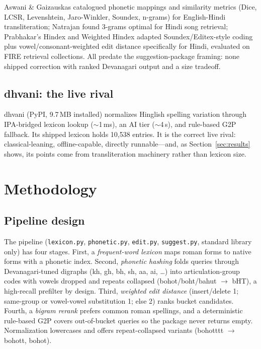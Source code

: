 \documentclass[11pt,a4paper]{article}
\begin{document}
Aswani \& Gaizauskas catalogued phonetic mappings and similarity metrics (Dice, LCSR, Levenshtein, Jaro-Winkler, Soundex, n-grams) for English-Hindi transliteration; Natrajan found 3-grams optimal for Hindi song retrieval; Prabhakar's Hindex and Weighted Hindex adapted Soundex/Editex-style coding plus vowel/consonant-weighted edit distance specifically for Hindi, evaluated on FIRE retrieval collections. All predate the suggestion-package framing: none shipped correction with ranked Devanagari output and a size tradeoff.

\subsection{dhvani: the live rival}

dhvani (PyPI, 9.7\,MB installed) normalizes Hinglish spelling variation through IPA-bridged lexicon lookup ($\sim$1\,ms), an AI tier ($\sim$4\,s), and rule-based G2P fallback. Its shipped lexicon holds 10,538 entries. It is the correct live rival: classical-leaning, offline-capable, directly runnable---and, as Section~\ref{sec:results} shows, its points come from transliteration machinery rather than lexicon size.

\section{Methodology}

\subsection{Pipeline design}

The pipeline (\verb!lexicon.py!, \verb!phonetic.py!, \verb!edit.py!, \verb!suggest.py!, standard library only) has four stages. First, a \textit{frequent-word lexicon} maps roman forms to native forms with a phonetic index. Second, \textit{phonetic hashing} folds queries through Devanagari-tuned digraphs (kh, gh, bh, sh, aa, ai, \ldots) into articulation-group codes with vowels dropped and repeats collapsed (bohot/boht/bahut $\to$ bHT), a high-recall prefilter by design. Third, \textit{weighted edit distance} (insert/delete 1; same-group or vowel-vowel substitution 1; else 2) ranks bucket candidates. Fourth, a \textit{bigram rerank} prefers common roman spellings, and a deterministic rule-based G2P covers out-of-bucket queries so the package never returns empty. Normalization lowercases and offers repeat-collapsed variants (bohotttt $\to$ bohott, bohot).
\end{document}
